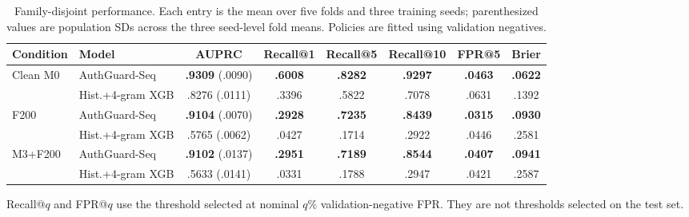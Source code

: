 \begin{table}[t]
  \centering
  \caption{Family-disjoint performance. Each entry is the mean over five folds and three training
  seeds; parenthesized values are population SDs across the three seed-level fold means. Policies
  are fitted using validation negatives.}
  \label{tab:three-seed}
  \scriptsize
  \setlength{\tabcolsep}{4.2pt}
  \begin{tabular}{@{}llcccccc@{}}
    \toprule
    Condition & Model & AUPRC & Recall@1 & Recall@5 & Recall@10 & FPR@5 & Brier \\
    \midrule
    Clean M0 & AuthGuard-Seq & \textbf{.9309} (.0090) & \textbf{.6008} & \textbf{.8282} & \textbf{.9297} & \textbf{.0463} & \textbf{.0622} \\
             & Hist.+4-gram XGB & .8276 (.0111) & .3396 & .5822 & .7078 & .0631 & .1392 \\
    \midrule
    F200 & AuthGuard-Seq & \textbf{.9104} (.0070) & \textbf{.2928} & \textbf{.7235} & \textbf{.8439} & \textbf{.0315} & \textbf{.0930} \\
         & Hist.+4-gram XGB & .5765 (.0062) & .0427 & .1714 & .2922 & .0446 & .2581 \\
    \midrule
    M3+F200 & AuthGuard-Seq & \textbf{.9102} (.0137) & \textbf{.2951} & \textbf{.7189} & \textbf{.8544} & \textbf{.0407} & \textbf{.0941} \\
            & Hist.+4-gram XGB & .5633 (.0141) & .0331 & .1788 & .2947 & .0421 & .2587 \\
    \bottomrule
  \end{tabular}
  \vspace{1pt}

  \parbox{.96\textwidth}{\scriptsize Recall@$q$ and FPR@$q$ use the threshold selected at nominal
  $q\%$ validation-negative FPR. They are not thresholds selected on the test set.}
\end{table}

